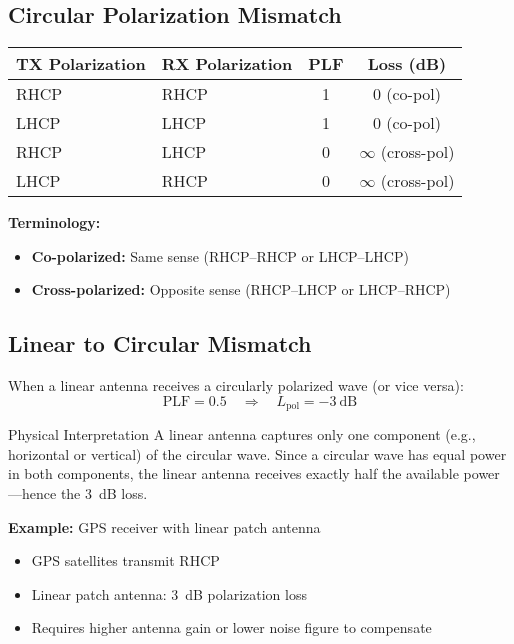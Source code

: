 \begin{center}
\subsection{Circular Polarization Mismatch}

\begin{center}
\begin{tabular}{@{}llcc@{}}
\toprule
\textbf{TX Polarization} & \textbf{RX Polarization} & \textbf{PLF} & \textbf{Loss (dB)} \\
\midrule
RHCP & RHCP & 1 & 0 (co-pol) \\
LHCP & LHCP & 1 & 0 (co-pol) \\
RHCP & LHCP & 0 & $\infty$ (cross-pol) \\
LHCP & RHCP & 0 & $\infty$ (cross-pol) \\
\bottomrule
\end{tabular}
\end{center}

\textbf{Terminology:}
\begin{itemize}
\item \textbf{Co-polarized:} Same sense (RHCP--RHCP or LHCP--LHCP)
\item \textbf{Cross-polarized:} Opposite sense (RHCP--LHCP or LHCP--RHCP)
\end{itemize}

\subsection{Linear to Circular Mismatch}

When a linear antenna receives a circularly polarized wave (or vice versa):
\begin{equation}
\mathrm{PLF} = 0.5 \quad \Rightarrow \quad L_{\text{pol}} = -3\ \text{dB}
\label{eq:lin-circ-loss}
\end{equation}

\begin{calloutbox}{Physical Interpretation}
A linear antenna captures only one component (e.g., horizontal or vertical) of the circular wave. Since a circular wave has equal power in both components, the linear antenna receives exactly half the available power---hence the 3~dB loss.
\end{calloutbox}

\textbf{Example:} GPS receiver with linear patch antenna
\begin{itemize}
\item GPS satellites transmit RHCP
\item Linear patch antenna: 3~dB polarization loss
\item Requires higher antenna gain or lower noise figure to compensate
\end{itemize}


\end{center}
